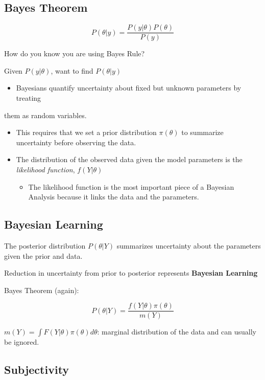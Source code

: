 \documentclass[11pt]{article}
\begin{document}
\subsection{Bayes Theorem}
\label{sec:orga2f1249}

$$
P(\theta | y) = \frac{P(y | \theta) P (\theta)}{P(y)}
$$

How do you know you are using Bayes Rule?

Given \(P(y | \theta)\), want to find \(P(\theta | y)\)


\begin{itemize}
\item Bayesians quantify uncertainty about fixed but unknown parameters by treating
\end{itemize}
them as random variables.
\begin{itemize}
\item This requires that we set a prior distribution \(\pi(\theta)\) to summarize
uncertainty before observing the data.
\item The distribution of the observed data given the model parameters is the
\emph{likelihood function}, \(f(Y | \theta)\)
\begin{itemize}
\item The likelihood function is the most important piece of a Bayesian Analysis
because it links the data and the parameters.
\end{itemize}
\end{itemize}

\subsection{Bayesian Learning}
\label{sec:org47fff9f}

The posterior distribution \(P(\theta | Y)\) summarizes uncertainty about the
parameters given the prior and data.

Reduction in uncertainty from prior to posterior represents \textbf{Bayesian Learning}

Bayes Theorem (again):

$$
P(\theta | Y) = \frac{f(Y | \theta) \pi (\theta)}{m(Y)}
$$

\(m(Y) = \int F(Y | \theta) \pi (\theta) d \theta\): marginal distribution of the
data and can usually be ignored.

\subsection{Subjectivity}
\label{sec:org65a5889}
\end{document}
